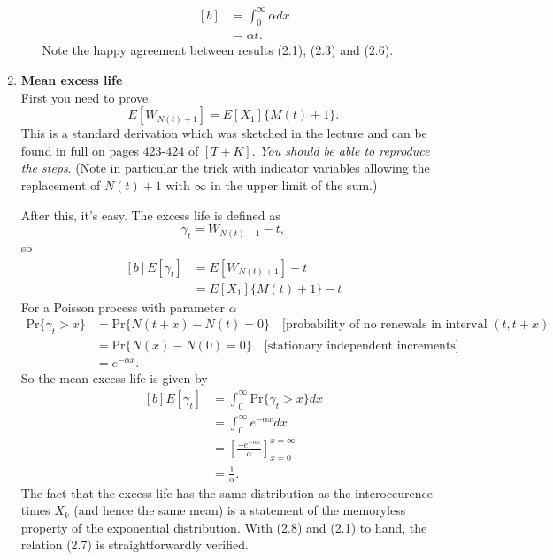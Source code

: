 \documentclass[11pt,a4paper]{article}
\begin{document}
\begin{enumerate}
\begin{enumerate}
\begin{equation}
\begin{aligned}[b]
          &= \int_0^\infty \alpha dx\\
          &= \alpha t.
        \end{aligned}
      \end{equation}
      Note the happy agreement between results (2.1), (2.3) and (2.6).
    \end{enumerate}
    \item \textbf{Mean excess life}\\
    First you need to prove
    $$
    E[W_{N(t) + 1}] = E[X_1]\{M(t) + 1\}.
    $$
    This is a standard derivation which was sketched in the lecture and can be found in full on pages 423-424 of $[T+K]$. \textit{You should be able to reproduce the steps}. (Note in particular the trick with indicator variables allowing the replacement of $N(t) + 1$ with $\infty$ in the upper limit of the sum.)\par
    After this, it's easy. The excess life is defined as
    $$
    \gamma_t = W_{N(t) + 1} - t,
    $$
    so
    \begin{equation}\tag{2.7}
      \begin{aligned}[b]
        E[\gamma_t]
        &= E[W_{N(t) + 1}] - t\\
        &= E[X_1]\{M(t) + 1\} - t
      \end{aligned}
    \end{equation}
    For a Poisson process with parameter $\alpha$
    \begin{align*}
      \text{Pr}\{\gamma_t > x\}
      &= \text{Pr}\{N(t + x) - N(t) = 0\}\quad \text{[probability of no renewals in interval $(t, t + x)$}\\
      &= \text{Pr}\{N(x) - N(0) = 0\}\quad \text{[stationary independent increments]}\\
      &= e^{-\alpha x}.
    \end{align*}
    So the mean excess life is given by
    \begin{equation}\tag{2.8}
      \begin{aligned}[b]
        E[\gamma_t]
        &= \int_0^\infty \text{Pr}\{\gamma_t > x\}dx\\
        &= \int_0^\infty e^{-\alpha x}dx\\
        &= \left[\frac{-e^{-\alpha x}}{\alpha}\right]_{x = 0}^{x = \infty}\\
        &= \frac{1}{\alpha}.
      \end{aligned}
    \end{equation}
    The fact that the excess life has the same distribution as the interoccurence times $X_k$ (and hence the same mean) is a statement of the memoryless property of the exponential distribution. With (2.8) and (2.1) to hand, the relation (2.7) is straightforwardly verified.

\end{enumerate}
\end{document}
